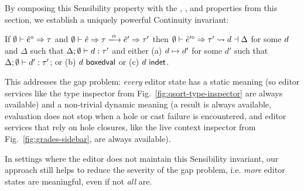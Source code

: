 By composing this Sensibility property with the ,
,  and
 properties from this section, we establish a
uniquely powerful Continuity invariant:
\begin{corol}[Continuity]
  \label{thrm:actsafe}
  If $\emptyset \vdash \hat{e}^{\diamond} \Rightarrow \tau$ and
    $\performSyn{\emptyset}{\zexp}{\htau}{\alpha}{\zexp'}{\tau'}$ then
    $\emptyset \vdash \hat{e}'^{\diamond} \Rightarrow \tau' \leadsto d \dashv \Delta$
      for some $d$ and $\Delta$ such that
$\Delta; \emptyset \vdash d : \tau'$
and either
  (a) $d \mapsto d'$ for some $d'$ such that $\Delta; \emptyset \vdash d' : \tau'$; or
  (b) $d~\mathsf{boxedval}$ or
  (c) $d~\mathsf{indet}$.
\end{corol}

This addresses the gap problem: \emph{every} editor state has a {static
meaning} (so editor services like the type inspector from Fig.~\ref{fig:qsort-type-inspector} are always available) and a non-trivial {dynamic meaning} (a result is always available, evaluation does not stop when a hole or cast failure is encountered, and editor services that rely on hole closures, like the live context inspector from Fig.~\ref{fig:grades-sidebar}, are always available).

In settings where the editor does not maintain this Sensibility invariant, our approach still helps to reduce the severity of the gap problem, i.e. \emph{more} editor states are meaningful, even if not \emph{all} are.%
%


